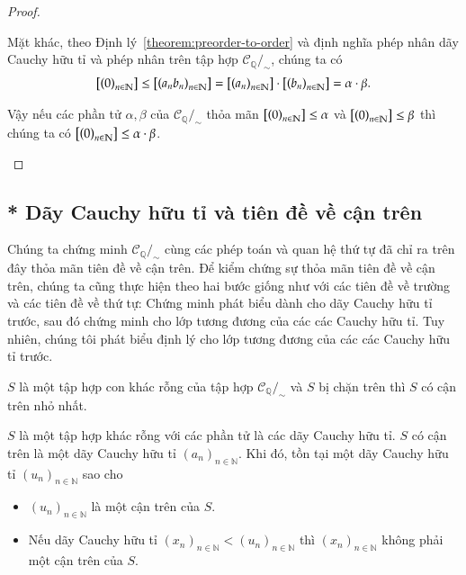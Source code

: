 \begin{proof}
\begin{enumerate}[label={(\roman*)}]
              Mặt khác, theo Định lý~\ref{theorem:preorder-to-order} và định nghĩa phép nhân dãy Cauchy hữu tỉ và phép nhân trên tập hợp $\mathscr{C}_{\mathbb{Q}}/_{\sim}$, chúng ta có
              \begin{align*}
                  \left[{\left({0}\right)}_{{n}\in\mathbb{N}}\right] \leq \left[{\left({a_{n}b_{n}}\right)}_{{n}\in\mathbb{N}}\right] = \left[{\left({a_{n}}\right)}_{{n}\in\mathbb{N}}\right]\cdot\left[{\left({b_{n}}\right)}_{{n}\in\mathbb{N}}\right] = \alpha\cdot\beta.
              \end{align*}

              Vậy nếu các phần tử $\alpha, \beta$ của $\mathscr{C}_{\mathbb{Q}}/_{\sim}$ thỏa mãn $\left[{\left({0}\right)}_{{n}\in\mathbb{N}}\right] \leq \alpha$ và $\left[{\left({0}\right)}_{{n}\in\mathbb{N}}\right]\leq \beta$ thì chúng ta có $\left[{\left({0}\right)}_{{n}\in\mathbb{N}}\right]\leq \alpha\cdot\beta$.
    \end{enumerate}
\end{proof}

\subsection{* Dãy Cauchy hữu tỉ và tiên đề về cận trên}

Chúng ta chứng minh $\mathscr{C}_{\mathbb{Q}}/_{\sim}$ cùng các phép toán và quan hệ thứ tự đã chỉ ra trên đây thỏa mãn tiên đề về cận trên. Để kiểm chứng sự thỏa mãn tiên đề về cận trên, chúng ta cũng thực hiện theo hai bước giống như với các tiên đề về trường và các tiên đề về thứ tự: Chứng minh phát biểu dành cho dãy Cauchy hữu tỉ trước, sau đó chứng minh cho lớp tương đương của các các Cauchy hữu tỉ. Tuy nhiên, chúng tôi phát biểu định lý cho lớp tương đương của các các Cauchy hữu tỉ trước.

\begin{theorem}\label{theorem:equivalence-class-cauchy-sequence-and-the-axioms-of-completeness}
    $S$ là một tập hợp con khác rỗng của tập hợp $\mathscr{C}_{\mathbb{Q}}/_{\sim}$ và $S$ bị chặn trên thì $S$ có cận trên nhỏ nhất.
\end{theorem}

\begin{theorem}\label{theorem:cauchy-sequence-and-the-axioms-of-completeness}
    $S$ là một tập hợp khác rỗng với các phần tử là các dãy Cauchy hữu tỉ. $S$ có cận trên là một dãy Cauchy hữu tỉ ${(a_{n})}_{n\in\mathbb{N}}$. Khi đó, tồn tại một dãy Cauchy hữu tỉ ${(u_{n})}_{n\in\mathbb{N}}$ sao cho
    \begin{itemize}
        \item ${(u_{n})}_{n\in\mathbb{N}}$ là một cận trên của $S$.
        \item Nếu dãy Cauchy hữu tỉ ${(x_{n})}_{n\in\mathbb{N}} < {(u_{n})}_{n\in\mathbb{N}}$ thì ${(x_{n})}_{n\in\mathbb{N}}$ không phải một cận trên của $S$.
    \end{itemize}
\end{theorem}


